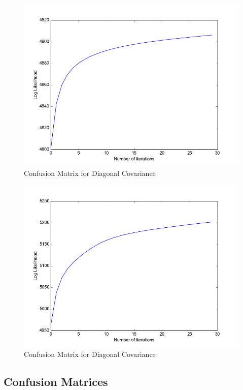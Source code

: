 \documentclass[11pt,a4paper]{article}
\begin{document}
\begin{minipage}[b]{0.5\textwidth}
\begin{figure}[H]
  \centering
  \includegraphics[width=.8\linewidth]{Figures/likelihood_HW6.png}
\caption{Confusion Matrix for Diagonal Covariance}
  \label{fig:sfig1}
\end{figure}%
\end{minipage}

\begin{minipage}[b]{0.5\textwidth}
\begin{figure}[H]
  \centering
  \includegraphics[width=.8\linewidth]{Figures/likelihood_HW7.png}
\caption{Confusion Matrix for Diagonal Covariance}
  \label{fig:sfig1}
\end{figure}%
\end{minipage}

\subsection{Confusion Matrices}
\end{document}
